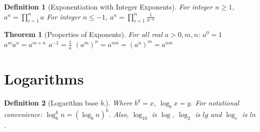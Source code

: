 \documentclass[]{tufte-handout}
\newtheorem{theorem}{Theorem}
\newtheorem{definition}{Definition}
\begin{document}
\begin{definition}[Exponentiation with Integer Exponents]
  \leavevmode\newline
\hspace{.25in}For integer $n\geq1$, $a^n = \prod\limits_{i=1}^{n} a$\newline
\leavevmode\newline
\hspace{.25in}For integer $n \leq -1$, $a^n = \prod\limits_{i=1}^{n} \frac{1}{a^{-n}}$\newline
\end{definition}

\begin{theorem}[Properties of Exponents]
  \leavevmode\newline
For all real $a > 0,m,n$:\newline
\hspace{.25in}$a^0 = 1$\newline
\hspace{.25in}$a^ma^n = a^{m+n}$\newline
\hspace{.25in}$a^{-1} = \frac{1}{a}$\newline
\hspace{.25in}$(a^m)^n = a^{mn} = (a^n)^m = a^{nm}$\newline
\end{theorem}

\section{Logarithms}

\begin{definition}[Logarithm base $b$.]
  \leavevmode\newline
{}Where $b^y = x$, $\log_b x = y$. For notational convenience: $\log_b^k n = (\log_b n)^k$. Also, $\log_{10}$ is $\log$, $\log_2$ is $lg$ and $\log_e$ is $ln$.
\end{definition}
\vspace{.25in}
\end{document}

